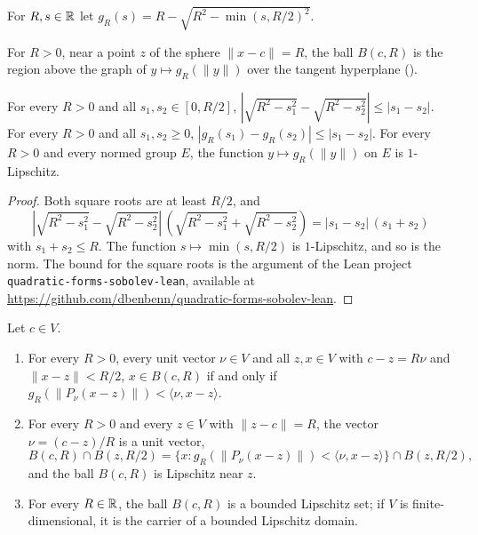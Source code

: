 \begin{definition}
\label{def:sphere-profile}
\leanok
For $R, s \in \mathbb{R}$ let $g_R(s) = R - \sqrt{R^2 - \min(s, R/2)^2}$.
\end{definition}

For $R > 0$, near a point $z$ of the sphere $\|x - c\| = R$, the ball $B(c, R)$ is the region
above the graph of $y \mapsto g_R(\|y\|)$ over the tangent hyperplane ().

\begin{lemma}
\label{lem:sphere-profile}
\leanok
{}
For every $R > 0$ and all $s_1, s_2 \in [0, R/2]$,
$|\sqrt{R^2 - s_1^2} - \sqrt{R^2 - s_2^2}| \leq |s_1 - s_2|$. For every $R > 0$ and all
$s_1, s_2 \geq 0$, $|g_R(s_1) - g_R(s_2)| \leq |s_1 - s_2|$. For every $R > 0$ and every normed
group $E$, the function $y \mapsto g_R(\|y\|)$ on $E$ is $1$-Lipschitz.
\end{lemma}

\begin{proof}
\leanok
Both square roots are at least $R/2$, and
\[
  |\sqrt{R^2 - s_1^2} - \sqrt{R^2 - s_2^2}| \, (\sqrt{R^2 - s_1^2} + \sqrt{R^2 - s_2^2})
  = |s_1 - s_2| \, (s_1 + s_2)
\]
with $s_1 + s_2 \leq R$. The function $s \mapsto \min(s, R/2)$ is $1$-Lipschitz, and so is the
norm. The bound for the square roots is the argument of the Lean project
\texttt{quadratic-\allowbreak forms-\allowbreak sobolev-\allowbreak lean}, available at
\url{https://github.com/dbenbenn/quadratic-forms-sobolev-lean}.
\end{proof}

\begin{theorem}
\label{thm:ball-lipschitz}
\leanok
{}
Let $c \in V$.
\begin{enumerate}
  \item For every $R > 0$, every unit vector $\nu \in V$ and all $z, x \in V$ with $c - z = R \nu$
    and $\|x - z\| < R/2$, $x \in B(c, R)$ if and only if
    $g_R(\|P_\nu(x - z)\|) < \langle \nu, x - z \rangle$.
  \item For every $R > 0$ and every $z \in V$ with $\|z - c\| = R$, the vector
    $\nu = (c - z)/R$ is a unit vector,
    \[
      B(c, R) \cap B(z, R/2)
      = \{x : g_R(\|P_\nu(x - z)\|) < \langle \nu, x - z \rangle\} \cap B(z, R/2) ,
    \]
    and the ball $B(c, R)$ is Lipschitz near $z$.
  \item For every $R \in \mathbb{R}$, the ball $B(c, R)$ is a bounded Lipschitz set; if $V$ is
    finite-dimensional, it is the carrier of a bounded Lipschitz domain.
\end{enumerate}
\end{theorem}


